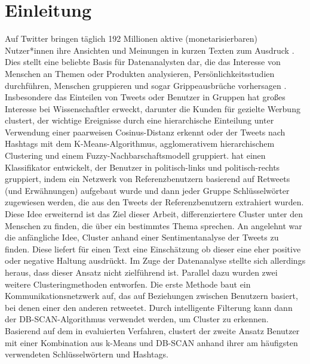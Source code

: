 \chapter{Einleitung}
\label{chap:einleitung}
Auf Twitter bringen täglich 192 Millionen aktive (monetarisierbaren) Nutzer*innen ihre Ansichten und Meinungen in kurzen Texten zum Ausdruck \cite{twitter-mdau}. Dies stellt eine beliebte Basis für Datenanalysten dar, die das Interesse von Menschen an Themen oder Produkten analysieren, Persönlichkeitsstudien durchführen, Menschen gruppieren und sogar Grippeausbrüche vorhersagen \cite{Achrekar2011}. Insbesondere das Einteilen von Tweets oder Benutzer in Gruppen hat großes Interesse bei Wissenschaftler erweckt, darunter \cite{Friedemann2015C} die Kunden für gezielte Werbung  clustert, \cite{Ifrim2014}  der wichtige Ereignisse durch eine hierarchische Einteilung unter Verwendung einer paarweisen Cosinus-Distanz erkennt oder \cite{Miyamoto2021} der Tweets nach Hashtags mit dem K-Means-Algorithmus, agglomerativem hierarchischem Clustering und einem Fuzzy-Nachbarschaftsmodell gruppiert. \cite{Conover2011-2} hat einen Klassifikator entwickelt, der Benutzer in politisch-links und politisch-rechts gruppiert, indem ein Netzwerk von Referenzbenutzern basierend auf Retweets (und Erwähnungen) aufgebaut wurde und dann jeder Gruppe Schlüsselwörter zugewiesen werden, die aus den Tweets der Referenzbenutzern extrahiert wurden. \\ \newline
Diese Idee erweiternd ist das Ziel dieser Arbeit, differenziertere Cluster unter den Menschen zu finden, die über ein bestimmtes Thema sprechen. An \cite{Kharde2016} angelehnt war die anfängliche Idee, Cluster anhand einer Sentimentanalyse der Tweets zu finden. Diese liefert für einen Text eine Einschätzung ob dieser eine eher positive oder negative Haltung ausdrückt. Im Zuge der Datenanalyse stellte sich allerdings heraus, dass dieser Ansatz nicht zielführend ist. Parallel dazu wurden zwei weitere Clusteringmethoden entworfen.  Die erste Methode baut ein Kommunikationsnetzwerk auf, das auf Beziehungen zwischen Benutzern basiert, bei denen einer den anderen retweetet. Durch intelligente Filterung kann dann der DB-SCAN-Algorithmus verwendet werden, um Cluster zu erkennen. \\ \newline
Basierend auf dem in \cite{Godfrey2014} evaluierten Verfahren, clustert der zweite Ansatz Benutzer mit einer Kombination aus k-Means und DB-SCAN anhand ihrer am häufigsten verwendeten Schlüsselwörtern und Hashtags. \\ \newline
